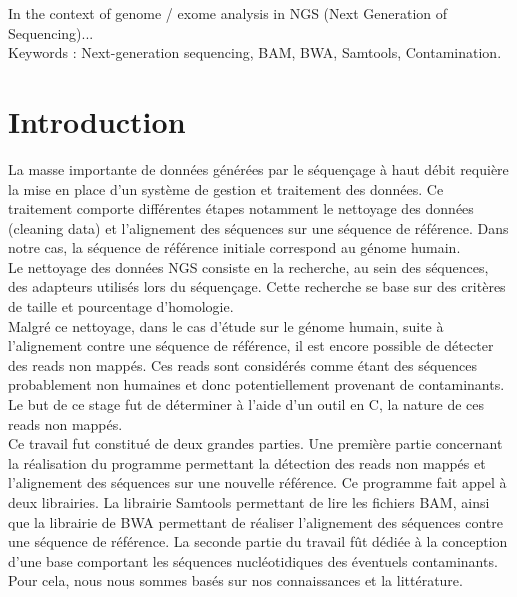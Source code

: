 \documentclass[a4paper,12pt]{article}
\begin{document}
In the context of genome / exome analysis in NGS (Next Generation of Sequencing)... \\

Keywords : Next-generation sequencing, BAM, BWA, Samtools, Contamination.
\clearpage %
\renewcommand{\contentsname}{Sommaire} 
\tableofcontents{} %
\clearpage

\section{Introduction}

La masse importante de données générées par le séquençage à haut débit requière la mise en place d'un système de gestion et traitement des données. Ce traitement comporte différentes étapes notamment le nettoyage des données (cleaning data) et l'alignement des séquences sur une séquence de référence. Dans notre cas, la séquence de référence initiale correspond au génome humain.\\

Le nettoyage des données NGS consiste en la recherche, au sein des séquences, des adapteurs  utilisés lors du séquençage. Cette recherche se base sur des critères de taille et pourcentage d'homologie.\\

Malgré ce nettoyage, dans le cas d'étude sur le génome humain, suite à l'alignement contre une séquence de référence, il est encore possible de détecter des reads non mappés. Ces reads sont considérés comme étant des séquences probablement non humaines et donc potentiellement provenant de contaminants. Le but de ce stage fut de déterminer à l'aide d'un outil en C, la nature de ces reads non mappés. \\

Ce travail fut constitué de deux grandes parties. Une première partie concernant la réalisation du programme permettant la détection des reads non mappés et l'alignement des séquences sur une nouvelle référence. Ce programme fait appel à deux librairies. La librairie Samtools permettant de lire les fichiers BAM, ainsi que la librairie de BWA permettant de réaliser l'alignement des séquences contre une séquence de référence. La seconde partie du travail fût dédiée à la conception d'une base comportant les séquences nucléotidiques des éventuels contaminants. Pour cela, nous nous sommes basés sur nos connaissances et la littérature. \\
\end{document}
